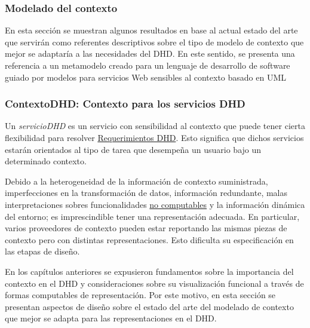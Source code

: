 

\subsubsection {Modelado del contexto} \label{sec:contextodhd}

En esta sección se muestran
algunos resultados en base al actual estado del arte que servirán como referentes
descriptivos sobre el tipo de modelo de contexto que mejor se adaptaría a las
necesidades del DHD. En este  sentido, se presenta una referencia a un metamodelo creado para un
lenguaje de desarrollo de software guiado por modelos para servicios Web
sensibles al contexto basado en UML\cite{ContextUML} 

\subsubsection{ContextoDHD: Contexto para los servicios DHD}\label{contextodhd}

Un \textit{servicioDHD}\label{serviciodhd} es un servicio con sensibilidad al
contexto que puede tener cierta flexibilidad para resolver 
\hyperref[RequerimientosDHD]{Requerimientos DHD}. Esto significa que dichos
servicios estarán orientados al tipo de tarea que desempeña un usuario bajo
un determinado contexto. 


Debido a la heterogeneidad de la información de contexto suministrada,
imperfecciones en la transformación de datos, información redundante, malas
interpretaciones sobres funcionalidades \hyperref[no_computable]{no
computables} y la información dinámica del entorno; es imprescindible tener
una representación adecuada\cite{contextToolKit}. En particular, varios
proveedores de contexto pueden estar reportando las mismas piezas de contexto
pero con distintas representaciones. Esto dificulta su especificación en
las etapas de diseño. 

En los capítulos anteriores se expusieron fundamentos sobre la
importancia del contexto en el DHD y consideraciones sobre su visualización funcional a través de formas computables de representación. Por este motivo, en esta sección se presentan aspectos de
diseño sobre el estado del arte del modelado de contexto que mejor se adapta
para las representaciones en el DHD. 


